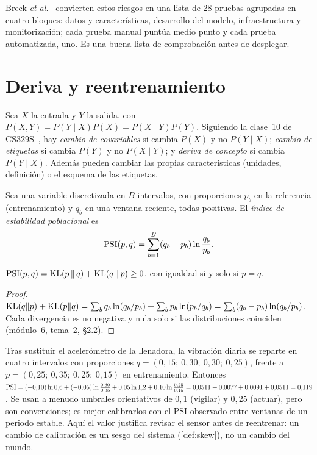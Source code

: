 Breck \emph{et al.}~\cite{breck} convierten estos riesgos en una lista de 28 pruebas agrupadas en cuatro bloques: datos y características, desarrollo del modelo, infraestructura y monitorización; cada prueba manual puntúa medio punto y cada prueba automatizada, uno. Es una buena lista de comprobación antes de desplegar.

\section{Deriva y reentrenamiento}

\begin{definicion}\label{def:deriva}
Sea $X$ la entrada y $Y$ la salida, con $P(X,Y)=P(Y\mid X)P(X)=P(X\mid Y)P(Y)$. Siguiendo la clase~10 de CS329S~\cite{cs329s}, hay \emph{cambio de covariables} si cambia $P(X)$ y no $P(Y\mid X)$; \emph{cambio de etiquetas} si cambia $P(Y)$ y no $P(X\mid Y)$; y \emph{deriva de concepto} si cambia $P(Y\mid X)$. Además pueden cambiar las propias características (unidades, definición) o el esquema de las etiquetas.
\end{definicion}

\begin{definicion}\label{def:psi}
Sea una variable discretizada en $B$ intervalos, con proporciones $p_b$ en la referencia (entrenamiento) y $q_b$ en una ventana reciente, todas positivas. El \emph{índice de estabilidad poblacional} es
\[
\operatorname{PSI}(p,q)=\sum_{b=1}^{B}(q_b-p_b)\ln\frac{q_b}{p_b}.
\]
\end{definicion}

\begin{proposicion}\label{prop:psi}
$\operatorname{PSI}(p,q)=\operatorname{KL}(p\,\|\,q)+\operatorname{KL}(q\,\|\,p)\ge 0$, con igualdad si y solo si $p=q$.
\end{proposicion}

\begin{proof}
$\operatorname{KL}(q\|p)+\operatorname{KL}(p\|q)=\sum_b q_b\ln(q_b/p_b)+\sum_b p_b\ln(p_b/q_b)=\sum_b(q_b-p_b)\ln(q_b/p_b)$. Cada divergencia es no negativa y nula solo si las distribuciones coinciden (módulo~6, tema~2, §2.2).
\end{proof}

\begin{ejemplo}\label{ej:psi}
Tras sustituir el acelerómetro de la llenadora, la vibración diaria se reparte en cuatro intervalos con proporciones $q=(0{,}15;\ 0{,}30;\ 0{,}30;\ 0{,}25)$, frente a $p=(0{,}25;\ 0{,}35;\ 0{,}25;\ 0{,}15)$ en entrenamiento. Entonces $\operatorname{PSI}=(-0{,}10)\ln0{,}6+(-0{,}05)\ln\frac{0{,}30}{0{,}35}+0{,}05\ln1{,}2+0{,}10\ln\frac{0{,}25}{0{,}15}=0{,}0511+0{,}0077+0{,}0091+0{,}0511=0{,}119$. Se usan a menudo umbrales orientativos de $0{,}1$ (vigilar) y $0{,}25$ (actuar), pero son convenciones; es mejor calibrarlos con el PSI observado entre ventanas de un periodo estable. Aquí el valor justifica revisar el sensor antes de reentrenar: un cambio de calibración es un sesgo del sistema (\cref{def:skew}), no un cambio del mundo.
\end{ejemplo}


